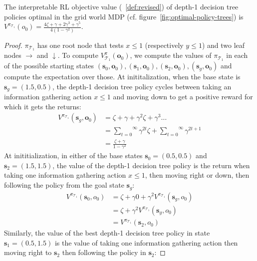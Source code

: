 \begin{proposition} The interpretable RL objective value (~\ref{def:revised}) of depth-1 decision tree policies optimal in the grid world MDP (cf. figure~\ref{fig:optimal-policy-trees}) is $V^{\pi_{\mathcal{T}_1}}(o_0) = \frac{4\zeta + \gamma + 2\gamma^3 + \gamma^5}{4(1-\gamma^2)}$.
\end{proposition}

\begin{proof} $\pi_{\mathcal{T}_1}$ has one root node that tests $x\leq1$ (respectively $y\leq1$) and two leaf nodes $\rightarrow$ and $\downarrow$. 
To compute $V^\pi_{\mathcal{T}_1}(\boldsymbol{o}_0)$, we compute the values of $\pi_{\mathcal{T}_1}$ in each of the possible starting states $(\boldsymbol{s}_0, \boldsymbol{o}_0), (\boldsymbol{s}_1, \boldsymbol{o}_0), (\boldsymbol{s}_2, \boldsymbol{o}_0), (\boldsymbol{s}_g, \boldsymbol{o}_0)$ and compute the expectation over those. 
At inititalization, when the base state is $\boldsymbol{s}_g = (1.5, 0.5)$, the depth-1 decision tree policy cycles between taking an information gathering action $x\leq1$ and moving down to get a positive reward for which it gets the returns:
\begin{align*}
    V^{\pi_{\mathcal{T}_1}} (\boldsymbol{s}_g, \boldsymbol{o}_0) &= \zeta + \gamma + \gamma^2 \zeta + \gamma^3 \dots \\
    &= \overset{\infty}{\underset{t=0}\sum} \gamma^{2t} \zeta + \overset{\infty}{\underset{t=0}\sum} \gamma^{2t+1} \\
    &= \frac{\zeta + \gamma}{1 - \gamma^2}
\end{align*}
At inititialization, in either of the base states $\boldsymbol{s}_0=(0.5,0.5)$ and $\boldsymbol{s}_2=(1.5, 1.5)$, the value of the depth-1 decision tree policy is the return when taking one information gathering action $x\leq1$, then moving right or down, then following the policy from the goal state $\boldsymbol{s}_g$:
\begin{align*}
    V^{\pi_{\mathcal{T}_1}} (\boldsymbol{s}_0, o_0) &= \zeta + \gamma 0 + \gamma^2 V^{\pi_{\mathcal{T}_1}} (\boldsymbol{s}_g, o_0) \\
    &= \zeta + \gamma^2 V^{\pi_{\mathcal{T}_1}} (\boldsymbol{s}_g, o_0) \\
    &= V^{\pi_{\mathcal{T}_1}} (\boldsymbol{s}_2, o_0)
\end{align*}
Similarly, the value of the best depth-1 decision tree policy in state $\boldsymbol{s}_1=(0.5,1.5)$ is the value of taking one information gathering action then moving right to $\boldsymbol{s}_2$ then following the policy in $\boldsymbol{s}_2$:

\end{proof}
